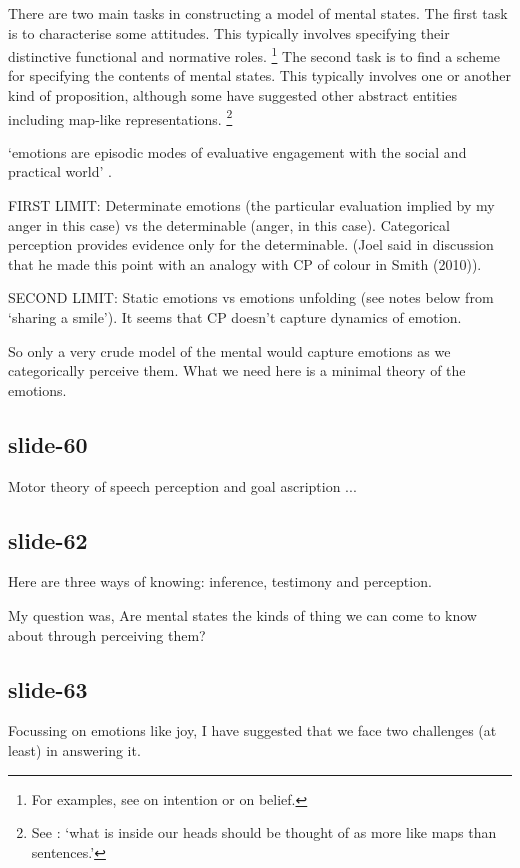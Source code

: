 \documentclass[12pt,\papersize]{extarticle}
\begin{document}
There are two main tasks in constructing a model of mental states.
The first task is to characterise some attitudes.
This typically involves specifying their distinctive functional and normative roles.%
\footnote{
For examples, see \citet{Bratman:1987xw} on intention or \citet[][chapter 11]{Velleman:2000fq} on belief.
}
%
The second task is to find a scheme for specifying the contents of mental states.
This typically involves one or another kind of proposition, although some  have suggested other abstract entities including map-like representations.%
\footnote{
See \citet[p.\ 163]{Braddon-Mitchell:1996ce}: ‘what is inside our heads should be thought of as more like maps than sentences.’
}

‘emotions are episodic modes of evaluative engagement with the social and practical world’
\citep[p.\ 1512]{parkinson:2008_emotions}.

FIRST LIMIT:
Determinate emotions (the particular evaluation implied by my anger in this case)
vs the determinable (anger, in this case).  Categorical perception provides evidence
only for the determinable. (Joel said in discussion that he made this point
with an analogy with CP of colour in Smith (2010)).

SECOND LIMIT:
Static emotions vs emotions unfolding (see notes below from ‘sharing a smile’).
It seems that CP doesn’t capture dynamics of emotion.

So only a very crude model of the mental would capture emotions as we
categorically perceive them.
What we need here is a minimal theory of the emotions.

\subsection{slide-60}
Motor theory of speech perception and goal ascription  ...

\subsection{slide-62}
Here are three ways of knowing: inference, testimony and perception.

My question was,
Are mental states the kinds of thing we can come to know about through
perceiving them?

\subsection{slide-63}
Focussing on emotions like joy, I have suggested that
we face two challenges (at least) in answering it.
\end{document}

